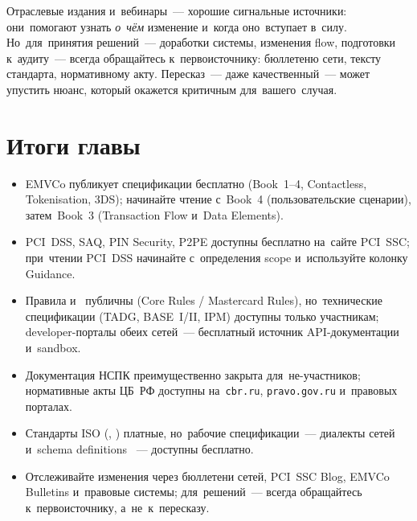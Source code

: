 \begin{important}
  Отраслевые издания и~вебинары~--- хорошие сигнальные
  источники: они~помогают узнать \emph{о~чём} изменение
  и~когда оно~вступает в~силу. Но~для~принятия решений~---
  доработки системы, изменения flow, подготовки к~аудиту~---
  всегда обращайтесь к~первоисточнику: бюллетеню сети,
  тексту стандарта, нормативному акту. Пересказ~--- даже
  качественный~--- может упустить нюанс, который окажется
  критичным для~вашего~случая.
\end{important}


\section*{Итоги главы}

\begin{itemize}
  \item EMVCo публикует спецификации бесплатно (Book~1--4,
        Contactless, Tokenisation, 3DS); начинайте чтение
        с~Book~4 (пользовательские сценарии), затем~Book~3
        (Transaction Flow и~Data Elements).
  \item PCI~DSS, SAQ, PIN Security, P2PE доступны бесплатно
        на~сайте PCI~SSC; при~чтении PCI~DSS начинайте
        с~определения scope и~используйте колонку Guidance.
  \item Правила  и~ публичны
        (Core Rules / Mastercard Rules), но~технические
        спецификации (TADG, BASE~I/II, IPM) доступны
        только участникам; developer-порталы обеих сетей~---
        бесплатный источник API-документации и~sandbox.
  \item Документация НСПК преимущественно закрыта для~не-участников;
        нормативные акты ЦБ~РФ доступны на~\texttt{cbr.ru},
        \texttt{pravo.gov.ru} и~правовых порталах.
  \item Стандарты ISO (, ) платные,
        но~рабочие спецификации~--- диалекты сетей и~schema
        definitions ~--- доступны бесплатно.
  \item Отслеживайте изменения через бюллетени сетей,
        PCI~SSC Blog, EMVCo Bulletins и~правовые системы;
        для~решений~--- всегда обращайтесь к~первоисточнику,
        а~не~к~пересказу.
\end{itemize}

